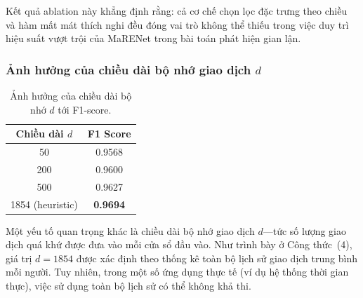 Kết quả ablation này khẳng định rằng: cả cơ chế chọn lọc đặc trưng theo chiều và hàm mất mát thích nghi đều đóng vai trò không thể thiếu trong việc duy trì hiệu suất vượt trội của MaRENet trong bài toán phát hiện gian lận.

\begin{table}[H]
\centering
\small
{}
\caption{Ablation về cơ chế \emph{masking} và hàm \emph{Focal Loss}. Cả hai thành phần đều đóng vai trò thiết yếu trong việc duy trì hiệu năng SOTA của MaRENet.}
\label{tab:ablation-core}
\end{table}


\subsubsection{Ảnh hưởng của chiều dài bộ nhớ giao dịch \(d\)}

\begin{table}[H]
\centering
\caption{Ảnh hưởng của chiều dài bộ nhớ \(d\) tới F1-score.}
\label{tab:memory-length}
\begin{tabular}{|c|c|}
\hline
\textbf{Chiều dài \(d\)} & \textbf{F1 Score}  \\
\hline
50   & 0.9568  \\
200  & 0.9600  \\
500  & 0.9627 \\
1854 (heuristic) & \textbf{0.9694} \\
\hline
\end{tabular}
\end{table}

Một yếu tố quan trọng khác là chiều dài bộ nhớ giao dịch \(d\)—tức số lượng giao dịch quá khứ được đưa vào mỗi cửa sổ đầu vào.  
Như trình bày ở Công thức~(4), giá trị \(d = 1854\) được xác định theo thống kê toàn bộ lịch sử giao dịch trung bình mỗi người. Tuy nhiên, trong một số ứng dụng thực tế (ví dụ hệ thống thời gian thực), việc sử dụng toàn bộ lịch sử có thể không khả thi.  

